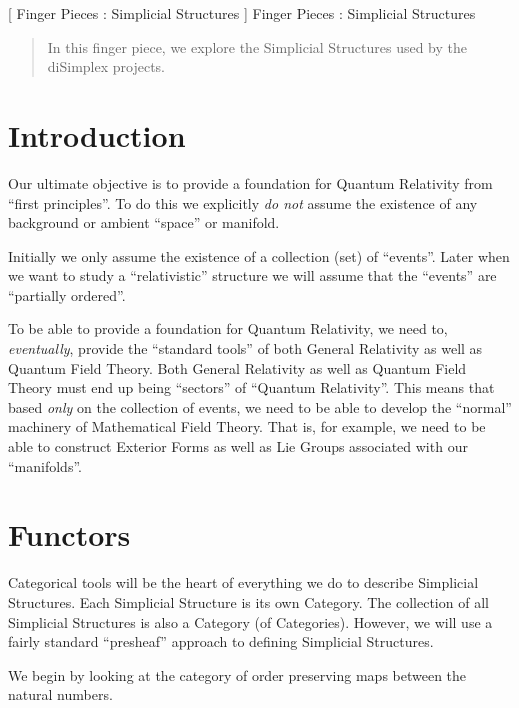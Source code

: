 
[
  Finger Pieces : Simplicial Structures
]{
  Finger Pieces : Simplicial Structures
}
\author{Stephen Gaito}

\maketitle

\begin{abstract}
  In this finger piece, we explore the Simplicial Structures used by the
  diSimplex projects.
\end{abstract}


\section*{Introduction}

Our ultimate objective is to provide a foundation for Quantum Relativity from
``first principles''. To do this we explicitly \emph{do not} assume the
existence of any background or ambient ``space'' or manifold.

Initially we only assume the existence of a collection (set) of ``events''.
Later when we want to study a ``relativistic'' structure we will assume that
the ``events'' are ``partially ordered''.

To be able to provide a foundation for Quantum Relativity, we need to,
\emph{eventually}, provide the ``standard tools'' of both General Relativity as
well as Quantum Field Theory. Both General Relativity as well as Quantum Field
Theory must end up being ``sectors'' of ``Quantum Relativity''. This means that
based \emph{only} on the collection of events, we need to be able to develop the
``normal'' machinery of Mathematical Field Theory. That is, for example, we need
to be able to construct Exterior Forms as well as Lie Groups associated with our
``manifolds''.

\section*{Functors} 

Categorical tools will be the heart of everything we do to describe Simplicial
Structures. Each Simplicial Structure is its own Category. The collection of all
Simplicial Structures is also a Category (of Categories). However, we will use a
fairly standard ``presheaf'' approach to defining Simplicial Structures. 

We begin by looking at the category of order preserving maps between the natural
numbers. 

